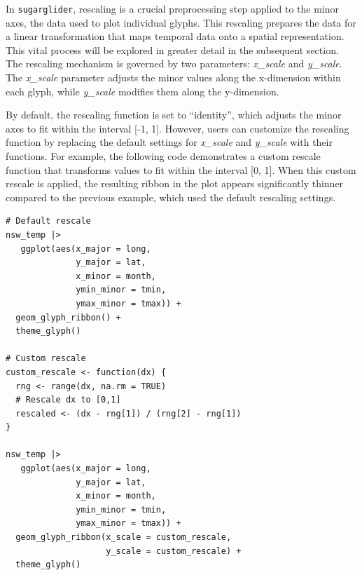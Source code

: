 In \texttt{sugarglider}, rescaling is a crucial preprocessing step applied to the minor axes, the data used to plot individual glyphs. This rescaling prepares the data for a linear transformation that maps temporal data onto a spatial representation. This vital process will be explored in greater detail in the subsequent section. The rescaling mechanism is governed by two parameters: \emph{x\_scale} and \emph{y\_scale}. The \emph{x\_scale} parameter adjusts the minor values along the x-dimension within each glyph, while \emph{y\_scale} modifies them along the y-dimension.

By default, the rescaling function is set to ``identity'', which adjusts the minor axes to fit within the interval {[}-1, 1{]}. However, users can customize the rescaling function by replacing the default settings for \emph{x\_scale} and \emph{y\_scale} with their functions. For example, the following code demonstrates a custom rescale function that transforms values to fit within the interval {[}0, 1{]}. When this custom rescale is applied, the resulting ribbon in the plot appears significantly thinner compared to the previous example, which used the default rescaling settings.

\begin{verbatim}
# Default rescale 
nsw_temp |>
   ggplot(aes(x_major = long,
              y_major = lat,
              x_minor = month,
              ymin_minor = tmin,
              ymax_minor = tmax)) +
  geom_glyph_ribbon() +
  theme_glyph() 

# Custom rescale 
custom_rescale <- function(dx) {
  rng <- range(dx, na.rm = TRUE)
  # Rescale dx to [0,1]
  rescaled <- (dx - rng[1]) / (rng[2] - rng[1])
}

nsw_temp |>
   ggplot(aes(x_major = long,
              y_major = lat,
              x_minor = month,
              ymin_minor = tmin,
              ymax_minor = tmax)) +
  geom_glyph_ribbon(x_scale = custom_rescale,
                    y_scale = custom_rescale) +
  theme_glyph() 
\end{verbatim}

